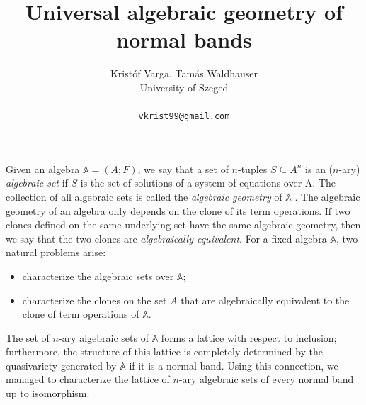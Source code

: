 \documentclass[a4paper]{article} %
\date{} %
\begin{document}
\setcounter{page}{1} %

\title{Universal algebraic geometry of normal bands}

\author{Kristóf Varga, Tamás Waldhauser \\ %
       University of Szeged\\ \\ %
       \texttt{vkrist99@gmail.com} %
       }%

\maketitle


Given an algebra $\mathbb A = (A; F )$, we say that a set of $n$-tuples $S \subseteq A^n$ is an ($n$-ary) \emph{algebraic set} if $S$ is the set of solutions of a system of equations over A. 
The collection of all algebraic sets is called the \emph{algebraic geometry} of $\mathbb A$ \cite{P}.
The algebraic geometry of an algebra only depends on the clone of its term operations.
If two clones defined on the same underlying set have the same algebraic geometry, then we say that the two clones are \emph{algebraically equivalent}.
For a fixed algebra $\mathbb A$, two natural problems arise:
\begin{itemize}
    \item characterize the algebraic sets over $\mathbb A$;
    \item characterize the clones on the set $A$ that are algebraically equivalent to the clone of term operations of $\mathbb A$.
\end{itemize}

The set of $n$-ary algebraic sets of $\mathbb A$ forms a lattice with respect to inclusion; furthermore, the structure of this lattice is completely determined by the quasivariety generated by $\mathbb A$ if it is a normal band.
Using this connection, we managed to characterize the lattice of $n$-ary algebraic sets of every normal band up to isomorphism.
\end{document}
